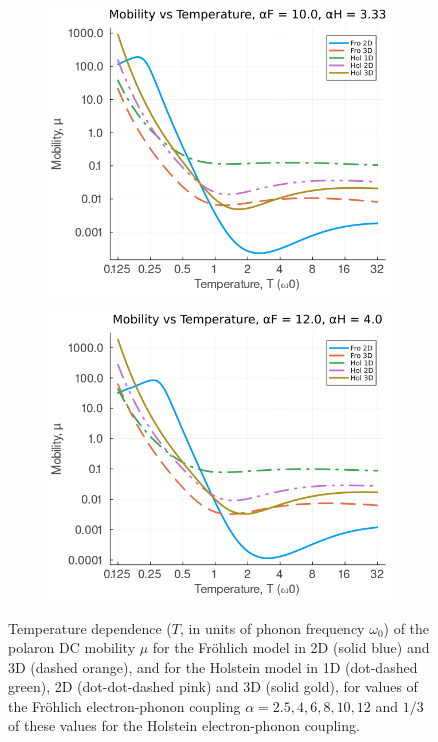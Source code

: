 \begin{figure}[!tbp]
\begin{subfigure}[b]{0.49\textwidth}
    \includegraphics[width=\textwidth]{figures/mobility_temp_10_333.png}
  \end{subfigure}
  \hfill
  \begin{subfigure}[b]{0.49\textwidth}
    \includegraphics[width=\textwidth]{figures/mobility_temp_12_4.png}
  \end{subfigure}
  \caption{Temperature dependence ($T$, in units of phonon frequency $\omega_0$) of the polaron DC mobility $\mu$ for the Fr\"ohlich model in 2D (solid blue) and 3D (dashed orange), and for the Holstein model in 1D (dot-dashed green), 2D (dot-dot-dashed pink) and 3D (solid gold), for values of the Fr\"ohlich electron-phonon coupling $\alpha = 2.5, 4, 6, 8, 10, 12$ and $1/3$ of these values for the Holstein electron-phonon coupling.}
  \label{fig:mobility_temp}
\end{figure}

